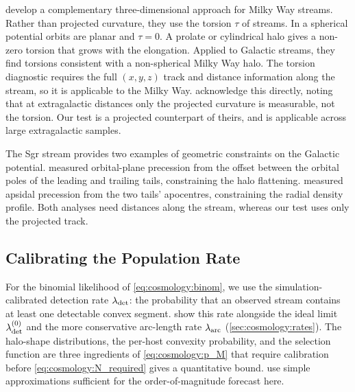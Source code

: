 \documentclass[linenumbers,twocolumn]{aastex701}
\newcommand{\torsion}{\tau}  %
\newcommand{\lamdadet}[1]{\ensuremath{\lambda_{\rm det}^{({#1})}}}
\begin{document}
        \citet{Bariego-Quintana:2024:TorsionStellarStreams} develop a complementary three-dimensional approach for Milky Way streams. %
        Rather than projected curvature, they use the torsion $\torsion$ of streams. %
        In a spherical potential orbits are planar and $\torsion = 0$. %
        A prolate or cylindrical halo gives a non-zero torsion that grows with the elongation. %
        Applied to Galactic streams, they find torsions consistent with a non-spherical Milky Way halo. %
        The torsion diagnostic requires the full $(x, y, z)$ track and distance information along the stream, so it is applicable to the Milky Way. %
        \citeauthor{Bariego-Quintana:2024:TorsionStellarStreams} acknowledge this directly, noting that at extragalactic distances only the projected curvature is measurable, not the torsion. %
        Our test is a projected counterpart of theirs, and is applicable across large extragalactic samples. %

        The \gls{Sgr} stream provides two examples of geometric constraints on the Galactic potential. %
        \citet{Johnston+:2005:TwoMicronAllSkySurvey} measured orbital-plane precession from the offset between the orbital poles of the leading and trailing tails, constraining the halo flattening. %
        \citet{Belokurov+:2014:PrecessionSagittariusStream} measured apsidal precession from the two tails' apocentres, constraining the radial density profile. %
        Both analyses need distances along the stream, whereas our test uses only the projected track. %


    \subsection{Calibrating the Population Rate}\label{sec:discussion:calibration}

        For the binomial likelihood of \cref{eq:cosmology:binom}, we use the simulation-calibrated detection rate $\lambda_{\rm det}$: the probability that an observed stream contains at least one detectable convex segment. %
         show this rate alongside the ideal limit $\lamdadet{0}$ and the more conservative arc-length rate $\lambda_{\rm arc}$ (\autoref{sec:cosmology:rates}). %
        The halo-shape distributions, the per-host convexity probability, and the selection function are three ingredients of \cref{eq:cosmology:p_M} that require calibration before \cref{eq:cosmology:N_required} gives a quantitative bound. %
         use simple approximations sufficient for the order-of-magnitude forecast here. %
\end{document}
